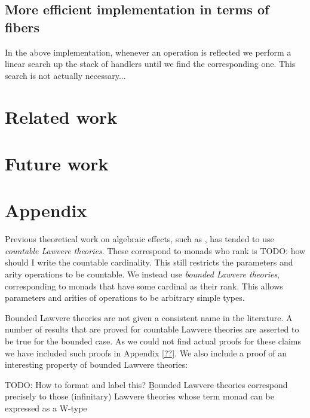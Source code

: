 \documentclass[acmsmall, screen, nonacm]{acmart}
\theoremstyle{definition}
\newcommand{\todo}[1]{{\color{red}TODO: #1}}
\begin{document}
\subsection{More efficient implementation in terms of fibers}

In the above implementation, whenever an operation is reflected we
perform a linear search up the stack of handlers until we find the
corresponding one. This search is not actually necessary...

\section{Related work}
\label{sec:related-work}

\section{Future work}
\label{sec:future-work}




\section{Appendix}

Previous theoretical work on algebraic effects, such as \cite{??},
has tended to use \emph{countable Lawvere theories}. These correspond to
monads who rank is \todo{how should I write the countable
  cardinality}. This still restricts the parameters and arity operations
to be countable. We instead use \emph{bounded Lawvere
  theories}, corresponding to monads that have some cardinal as their
rank. This allows parameters and arities of operations to be arbitrary
simple types.

Bounded Lawvere theories are not given a consistent name in the
literature. A number of results that are proved for countable Lawvere
theories are asserted to be true for the bounded case. As we could not
find actual proofs for these claims we have included such proofs in
Appendix \ref{??}. We also include a proof of an interesting property
of bounded Lawvere theories:

\todo{How to format and label this?}  {\b Bounded Lawvere theories
  correspond precisely to those (infinitary) Lawvere theories whose
  term monad can be expressed as a W-type}
\end{document}

